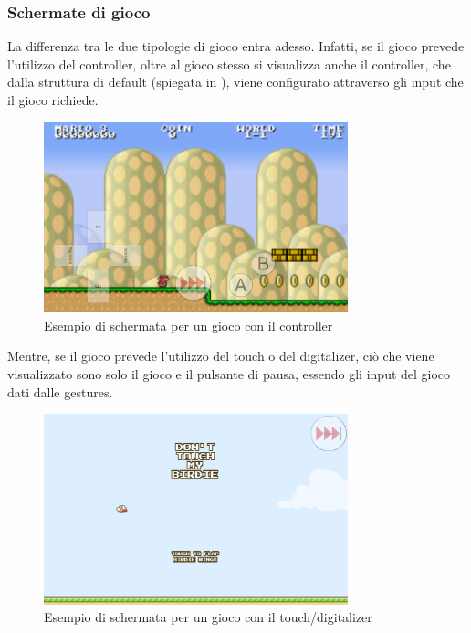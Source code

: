 \subsubsection{Schermate di gioco}
La differenza tra le due tipologie di gioco entra adesso.
Infatti, se il gioco prevede l'utilizzo del controller, oltre al gioco stesso si visualizza anche il controller, che dalla struttura di default (spiegata in ), viene configurato attraverso gli input che il gioco richiede.
\begin{figure}[h]
    \centering
    \includegraphics[width=250pt]{images/product/schermataGiocoController.png}
    \caption{Esempio di schermata per un gioco con il controller}
    \label{fig:schermataGiocoController}
\end{figure}
\newpage
Mentre, se il gioco prevede l'utilizzo del touch o del digitalizer, ciò che viene visualizzato sono solo il gioco e il pulsante di pausa, essendo gli input del gioco dati dalle gestures.
\begin{figure}[h]
    \centering
    \includegraphics[width=250pt]{images/product/schermataGiocoTouchDigit.png}
    \caption{Esempio di schermata per un gioco con il touch/digitalizer}
    \label{fig:schermataGiocoTouchDigit}
\end{figure}
